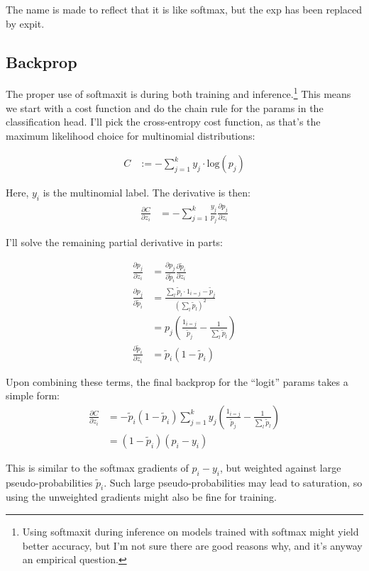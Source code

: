 \documentclass{article}
\begin{document}
The name is made to reflect that it is like softmax, but the exp has been replaced by expit.

\subsection{Backprop}

The proper use of softmaxit is during both training and inference.\footnote{Using softmaxit during inference on models trained with softmax might yield better accuracy, but I'm not sure there are good reasons why, and it's anyway an empirical question.} This means we start with a cost function and do the chain rule for the params in the classification head. I'll pick the cross-entropy cost function, as that's the maximum likelihood choice for multinomial distributions:

\begin{align}
C&:=-\sum_{j=1}^ky_j\cdot \text{log}(p_j)
\end{align}

Here, $y_i$ is the multinomial label. The derivative is then:
\begin{align}
\frac{\partial C}{\partial z_i} &= -\sum_{j=1}^k \frac{y_j}{p_j}\frac{\partial p_j}{\partial z_i}
\end{align}

I'll solve the remaining partial derivative in parts:

\begin{align}
\frac{\partial p_j}{\partial z_i} &= \frac{\partial p_j}{\partial \tilde{p}_i}\frac{\partial \tilde{p}_i}{\partial z_i} \\
\frac{\partial p_j}{\partial \tilde{p}_i} &=\frac{\sum_l\tilde{p}_l\cdot 1_{i=j} - \tilde{p}_j}{\left(\sum_l\tilde{p}_l\right)^2} \\
&= p_j\left(\frac{1_{i=j}}{\tilde{p}_j}-\frac{1}{\sum_l\tilde{p}_l}\right) \\
\frac{\partial \tilde{p}_i}{\partial z_i} &= \tilde{p}_i(1-\tilde{p}_i)
\end{align}

Upon combining these terms, the final backprop for the ``logit'' params takes a simple form:
\begin{align}
\frac{\partial C}{\partial z_i} &= -\tilde{p}_i(1-\tilde{p}_i)\sum_{j=1}^k y_j\left(\frac{1_{i=j}}{\tilde{p}_j}-\frac{1}{\sum_l\tilde{p}_l}\right) \\
&= \boxed{(1-\tilde{p}_i)(p_i-y_i)}
\end{align}

This is similar to the softmax gradients of $p_i-y_i$, but weighted against large pseudo-probabilities $\tilde{p}_i$. Such large pseudo-probabilities may lead to saturation, so using the unweighted gradients might also be fine for training.
\end{document}
